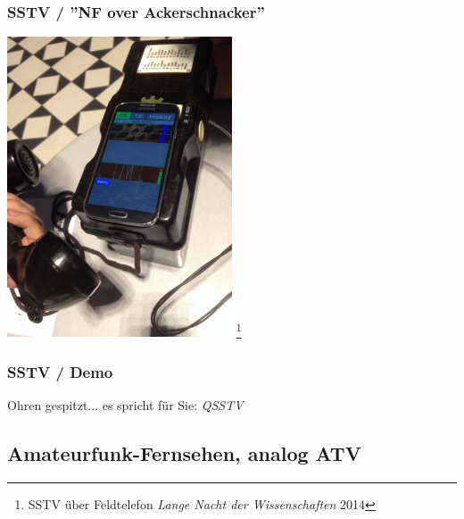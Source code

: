\begin{frame}
    \frametitle{SSTV / ''NF over Ackerschnacker''}

    \begin{center}
        \includegraphics[width=0.5\textwidth]{e16/SSTV-over-Ackerschnacker_LNDW2014.jpg}
        \footnote{SSTV über Feldtelefon \emph{Lange Nacht der Wissenschaften} 2014}
    \end{center}

\end{frame}

\begin{frame}
    \frametitle{SSTV / Demo}

    \Large{Ohren gespitzt... es spricht für Sie: \emph{QSSTV}}

\end{frame}

\subsection[ATV]{Amateurfunk-Fernsehen, analog ATV}

